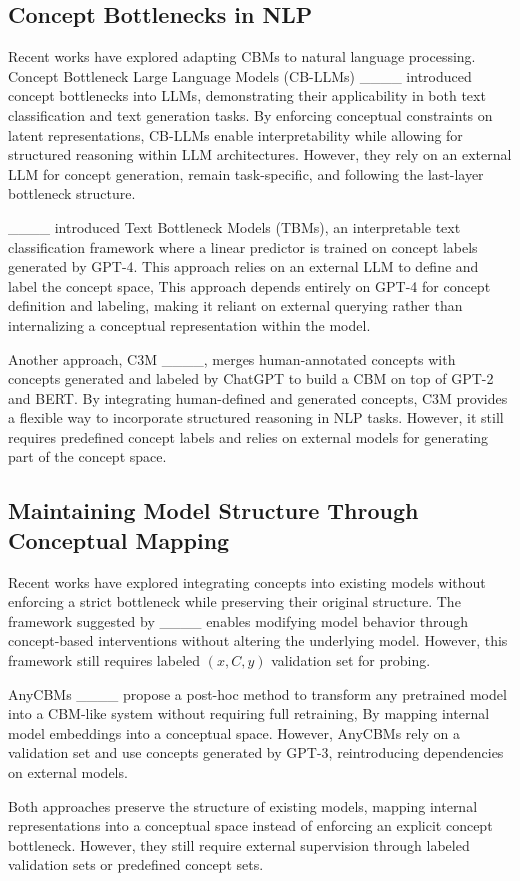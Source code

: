 \subsection{Concept Bottlenecks in NLP}

Recent works have explored adapting CBMs to natural language processing. Concept Bottleneck Large Language Models (CB-LLMs) ____ introduced concept bottlenecks into LLMs, demonstrating their applicability in both text classification and text generation tasks. By enforcing conceptual constraints on latent representations, CB-LLMs enable interpretability while allowing for structured reasoning within LLM architectures. However, they rely on an external LLM for concept generation, remain task-specific, and following the last-layer bottleneck structure.

____ introduced Text Bottleneck Models (TBMs), an interpretable text classification framework where a linear predictor is trained on concept labels generated by GPT-4. This approach relies on an external LLM to define and label the concept space, This approach depends entirely on GPT-4 for concept definition and labeling, making it reliant on external querying rather than internalizing a conceptual representation within the model.

Another approach, C3M ____, merges human-annotated concepts with concepts generated and labeled by ChatGPT to build a CBM on top of GPT-2 and BERT. By integrating human-defined and generated concepts, C3M provides a flexible way to incorporate structured reasoning in NLP tasks. However, it still requires predefined concept labels and relies on external models for generating part of the concept space.

\subsection{Maintaining Model Structure Through Conceptual Mapping}

Recent works have explored integrating concepts into existing models without enforcing a strict bottleneck while preserving their original structure. The framework suggested by ____ enables modifying model behavior through concept-based interventions without altering the underlying model. However, this framework still requires labeled $(x, C, y)$ validation set for probing.


AnyCBMs ____ propose a post-hoc method to transform any pretrained model into a CBM-like system without requiring full retraining, By mapping internal model embeddings into a conceptual space. However, AnyCBMs rely on a validation set and use concepts generated by GPT-3, reintroducing dependencies on external models.

Both approaches preserve the structure of existing models, mapping internal representations into a conceptual space instead of enforcing an explicit concept bottleneck. However, they still require external supervision through labeled validation sets or predefined concept sets.